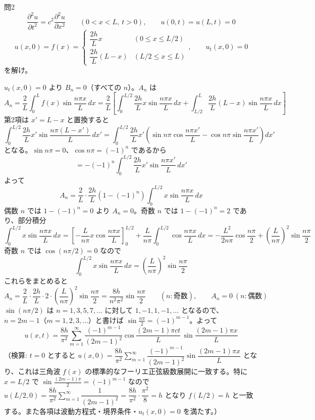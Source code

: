 \documentclass[a4paper,11pt]{article}
\begin{document}
\clearpage
\begin{mondaiboxS}{問2}
\[
\frac{\partial^{2} u}{\partial t^{2}} = c^{2}\frac{\partial^{2} u}{\partial x^{2}} \qquad (0 < x < L,\ t > 0), \qquad u(0,t)=u(L,t)=0
\]
\[
u(x,0) = f(x) =
\begin{cases}
\dfrac{2h}{L}x & (0 \le x \le L/2) \\[1mm]
\dfrac{2h}{L}(L-x) & (L/2 \le x \le L)
\end{cases}, \qquad u_{t}(x,0) = 0
\]
を解け。
\end{mondaiboxS}
\kaitou
$u_{t}(x,0)=0$ より $B_{n}=0$（すべての $n$）。$A_{n}$ は
\[
A_{n} = \frac{2}{L}\int_{0}^{L} f(x)\sin\frac{n\pi x}{L}\,dx
= \frac{2}{L}\left[\int_{0}^{L/2}\frac{2h}{L}x\sin\frac{n\pi x}{L}\,dx + \int_{L/2}^{L}\frac{2h}{L}(L-x)\sin\frac{n\pi x}{L}\,dx\right]
\]
第2項は $x' = L-x$ と置換すると
\[
\int_{0}^{L/2}\frac{2h}{L}x'\sin\frac{n\pi(L-x')}{L}\,dx'
= \int_{0}^{L/2}\frac{2h}{L}x'\left(\sin n\pi\cos\frac{n\pi x'}{L} - \cos n\pi\sin\frac{n\pi x'}{L}\right)dx'
\]
となる。$\sin n\pi = 0$、$\cos n\pi = (-1)^{n}$ であるから
\[
= -(-1)^{n}\int_{0}^{L/2}\frac{2h}{L}x'\sin\frac{n\pi x'}{L}\,dx'
\]
よって
\[
A_{n} = \frac{2}{L}\cdot\frac{2h}{L}\left(1-(-1)^{n}\right)\int_{0}^{L/2} x\sin\frac{n\pi x}{L}\,dx
\]
偶数 $n$ では $1-(-1)^n=0$ より $A_{n}=0$。奇数 $n$ では $1-(-1)^{n}=2$ であり、部分積分
\[
\int_{0}^{L/2} x\sin\frac{n\pi x}{L}\,dx
= \left[-\frac{L}{n\pi}x\cos\frac{n\pi x}{L}\right]_{0}^{L/2} + \frac{L}{n\pi}\int_{0}^{L/2}\cos\frac{n\pi x}{L}\,dx
= -\frac{L^{2}}{2n\pi}\cos\frac{n\pi}{2} + \left(\frac{L}{n\pi}\right)^{2}\sin\frac{n\pi}{2}
\]
奇数 $n$ では $\cos(n\pi/2)=0$ なので
\[
\int_{0}^{L/2} x\sin\frac{n\pi x}{L}\,dx = \left(\frac{L}{n\pi}\right)^{2}\sin\frac{n\pi}{2}
\]
これらをまとめると
\[
A_{n} = \frac{2}{L}\cdot\frac{2h}{L}\cdot 2 \cdot \left(\frac{L}{n\pi}\right)^{2}\sin\frac{n\pi}{2} = \frac{8h}{n^{2}\pi^{2}}\sin\frac{n\pi}{2}
\qquad (n:\text{奇数}),\qquad A_{n}=0\ (n:\text{偶数})
\]
$\sin(n\pi/2)$ は $n=1,3,5,7,\dots$ に対して $1,-1,1,-1,\dots$ となるので、$n=2m-1$（$m=1,2,3,\dots$）と書けば $\sin\frac{n\pi}{2} = (-1)^{m-1}$。よって
\[
\boxed{\;
u(x,t) = \frac{8h}{\pi^{2}}\sum_{m=1}^{\infty}\frac{(-1)^{m-1}}{(2m-1)^{2}}\cos\frac{(2m-1)\pi c t}{L}\,\sin\frac{(2m-1)\pi x}{L}
\;}
\]
（検算: $t=0$ とすると $u(x,0) = \dfrac{8h}{\pi^{2}}\sum_{m=1}^{\infty}\dfrac{(-1)^{m-1}}{(2m-1)^{2}}\sin\dfrac{(2m-1)\pi x}{L}$ となり、これは三角波 $f(x)$ の標準的なフーリエ正弦級数展開に一致する。特に $x=L/2$ で $\sin\frac{(2m-1)\pi}{2}=(-1)^{m-1}$ なので $u(L/2,0) = \dfrac{8h}{\pi^2}\sum_{m=1}^\infty \dfrac{1}{(2m-1)^2} = \dfrac{8h}{\pi^2}\cdot\dfrac{\pi^2}{8} = h$ となり $f(L/2)=h$ と一致する。また各項は波動方程式・境界条件・$u_t(x,0)=0$ を満たす。）
\end{document}
